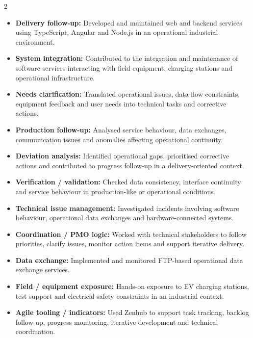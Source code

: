 \documentclass[8pt,a4paper,ragged2e,withhyper]{altacv}
\begin{document}
\begin{paracol}{2}
\begin{itemize}
  \item \textbf{Delivery follow-up:} Developed and maintained web and backend services using TypeScript, Angular and Node.js in an operational industrial environment.
  \item \textbf{System integration:} Contributed to the integration and maintenance of software services interacting with field equipment, charging stations and operational infrastructure.
  \item \textbf{Needs clarification:} Translated operational issues, data-flow constraints, equipment feedback and user needs into technical tasks and corrective actions.
  \item \textbf{Production follow-up:} Analysed service behaviour, data exchanges, communication issues and anomalies affecting operational continuity.
  \item \textbf{Deviation analysis:} Identified operational gaps, prioritised corrective actions and contributed to progress follow-up in a delivery-oriented context.
  \item \textbf{Verification / validation:} Checked data consistency, interface continuity and service behaviour in production-like or operational conditions.
  \item \textbf{Technical issue management:} Investigated incidents involving software behaviour, operational data exchanges and hardware-connected systems.
  \item \textbf{Coordination / PMO logic:} Worked with technical stakeholders to follow priorities, clarify issues, monitor action items and support iterative delivery.
  \item \textbf{Data exchange:} Implemented and monitored FTP-based operational data exchange services.
  \item \textbf{Field / equipment exposure:} Hands-on exposure to EV charging stations, test support and electrical-safety constraints in an industrial context.
  \item \textbf{Agile tooling / indicators:} Used Zenhub to support task tracking, backlog follow-up, progress monitoring, iterative development and technical coordination.
\end{itemize}

\divider



\end{paracol}
\end{document}
